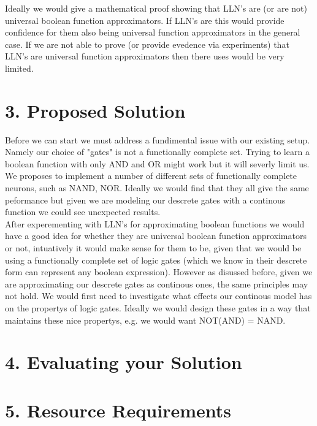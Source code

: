 \documentclass[11pt, a4paper, twoside, openright]{report}
\begin{document}
Ideally we would give a mathematical proof showing that LLN's are (or are not) universal boolean function approximators. If LLN's are this would provide confidence for them also being universal function approximators in the general case. If we are not able to prove (or provide evedence via experiments) that LLN's are universal function approximators then there uses would be very limited.

\section*{3. Proposed Solution}

Before we can start we must address a fundimental issue with our existing setup.  Namely our choice of "gates" is not a functionally complete set. Trying to learn a boolean function with only AND and OR might work but it will severly limit us. We proposes to implement a number of different sets of functionally complete neurons, such as NAND, NOR. Ideally we would find that they all give the same peformance but given we are modeling our descrete gates with a continous function we could see unexpected results. \\

After experementing with LLN's for approximating boolean functions we would have a good idea for whether they are universal boolean function approximators or not, intuatively it would make sense for them to be, given that we would be using a functionally complete set of logic gates (which we know in their descrete form can represent any boolean expression). However as disussed before, given we are approximating our descrete gates as continous ones, the same principles may not hold. We would first need to investigate what effects our continous model has on the propertys of logic gates. Ideally we would design these gates in a way that maintains these nice propertys, e.g. we would want NOT(AND) =  NAND.

\section*{4. Evaluating your Solution}

\section*{5. Resource Requirements}

\backmatter

%


\end{document}

